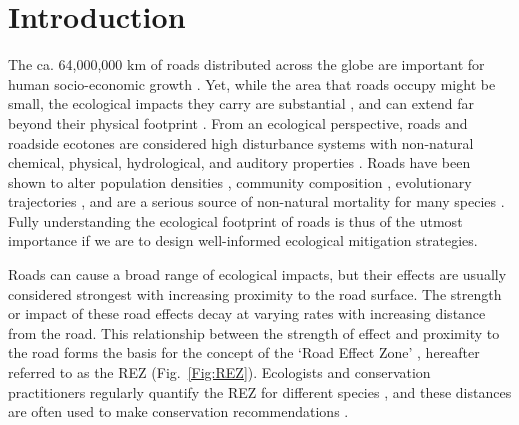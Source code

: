 \documentclass[11pt]{article}
\begin{document}
\newpage{}



\section*{Introduction}

The ca. 64,000,000 km of roads distributed across the globe are important for human socio-economic growth \citep{Ibisch:2016}. Yet, while the area that roads occupy might be small, the ecological impacts they carry are substantial \citep{Coffin:2007, Fahrig:2009, Ascensao:2022}, and can extend far beyond their physical footprint \citep{Forman:1998, Forman:2003}. From an ecological perspective, roads and roadside ecotones are considered high disturbance systems with non-natural chemical, physical, hydrological, and auditory properties \citep{Reijnen:1996, Forman:1998, Brady:2017}. Roads have been shown to alter population densities \citep{Reijnen:1996, Fahrig:2009, Andrasi:2021}, community composition \citep{Truscott:2005}, evolutionary trajectories \citep{Brown:2013, Brady:2017}, and are a serious source of non-natural mortality for many species \citep{Desbiez:2020, Silva:2020, Carter:2020, Ascensao:2022}. Fully understanding the ecological footprint of roads is thus of the utmost importance if we are to design well-informed ecological mitigation strategies.

Roads can cause a broad range of ecological impacts, but their effects are usually considered strongest with increasing proximity to the road surface. The strength or impact of these road effects decay at varying rates with increasing distance from the road. This relationship between the strength of effect and proximity to the road forms the basis for the concept of the  `Road Effect Zone' \citep{Forman:1998, Forman:2000}, hereafter referred to as the REZ (Fig.~\ref{Fig:REZ}). Ecologists and conservation practitioners regularly quantify the REZ for different species \citep[e.g.,][]{Semlitsch:2007, Eigenbrod:2009, Andrasi:2021}, and these distances are often used to make conservation recommendations \citep[e.g.,][]{Forman:2000b, Peaden:2015, Ford:2020}.
\end{document}
